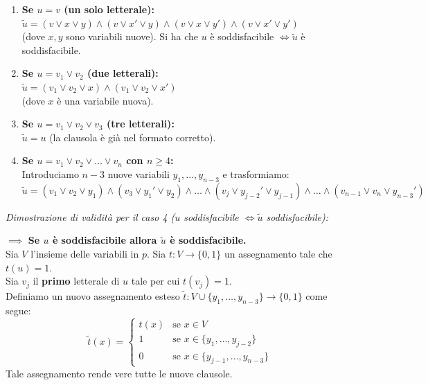 \begin{enumerate}
    \item \textbf{Se $u = v$ (un solo letterale):} \\
    $\tilde{u} = (v \lor x \lor y) \land (v \lor x' \lor y) \land (v \lor x \lor y') \land (v \lor x' \lor y')$ \\
    (dove $x, y$ sono variabili nuove). Si ha che $u$ è soddisfacibile $\iff \tilde{u}$ è soddisfacibile.
    
    \item \textbf{Se $u = v_1 \lor v_2$ (due letterali):} \\
    $\tilde{u} = (v_1 \lor v_2 \lor x) \land (v_1 \lor v_2 \lor x')$ \\
    (dove $x$ è una variabile nuova).
    
    \item \textbf{Se $u = v_1 \lor v_2 \lor v_3$ (tre letterali):} \\
    $\tilde{u} = u$ (la clausola è già nel formato corretto).
    
    \item \textbf{Se $u = v_1 \lor v_2 \lor \dots \lor v_n$ con $n \ge 4$:} \\
    Introduciamo $n-3$ nuove variabili $y_1, \dots, y_{n-3}$ e trasformiamo:
    $$ \tilde{u} = (v_1 \lor v_2 \lor y_1) \land (v_3 \lor y_1' \lor y_2) \land \dots \land (v_j \lor y_{j-2}' \lor y_{j-1}) \land \dots \land (v_{n-1} \lor v_n \lor y_{n-3}') $$
\end{enumerate}

\vspace{0.4cm}
\textit{Dimostrazione di validità per il caso 4 ($u$ soddisfacibile $\iff \tilde{u}$ soddisfacibile):}

$\implies$ \textbf{Se $u$ è soddisfacibile allora $\tilde{u}$ è soddisfacibile.} \\
Sia $V$ l'insieme delle variabili in $p$. Sia $t: V \to \{0,1\}$ un assegnamento tale che $t(u) = 1$. \\
Sia $v_j$ il \textbf{primo} letterale di $u$ tale per cui $t(v_j) = 1$. \\
Definiamo un nuovo assegnamento esteso $\tilde{t}: V \cup \{y_1, \dots, y_{n-3}\} \to \{0,1\}$ come segue:
$$ \tilde{t}(x) = 
\begin{cases} 
t(x) & \text{se } x \in V \\
1 & \text{se } x \in \{y_1, \dots, y_{j-2}\} \\
0 & \text{se } x \in \{y_{j-1}, \dots, y_{n-3}\} 
\end{cases} 
$$
Tale assegnamento rende vere tutte le nuove clausole.

